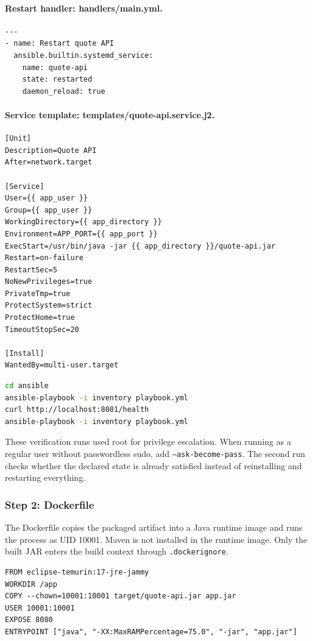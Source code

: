 \documentclass[12pt,a4paper]{article}
\begin{document}
\paragraph{Restart handler: handlers/main.yml.}

\begin{lstlisting}[language={}]
---
- name: Restart quote API
  ansible.builtin.systemd_service:
    name: quote-api
    state: restarted
    daemon_reload: true
\end{lstlisting}

\paragraph{Service template: templates/quote-api.service.j2.}

\begin{lstlisting}[language={}]
[Unit]
Description=Quote API
After=network.target

[Service]
User={{ app_user }}
Group={{ app_user }}
WorkingDirectory={{ app_directory }}
Environment=APP_PORT={{ app_port }}
ExecStart=/usr/bin/java -jar {{ app_directory }}/quote-api.jar
Restart=on-failure
RestartSec=5
NoNewPrivileges=true
PrivateTmp=true
ProtectSystem=strict
ProtectHome=true
TimeoutStopSec=20

[Install]
WantedBy=multi-user.target
\end{lstlisting}

\begin{lstlisting}[language={bash}]
cd ansible
ansible-playbook -i inventory playbook.yml
curl http://localhost:8081/health
ansible-playbook -i inventory playbook.yml
\end{lstlisting}


These verification runs used root for privilege escalation. When running as a regular user without passwordless sudo, add \texttt{--ask-become-pass}. The second run checks whether the declared state is already satisfied instead of reinstalling and restarting everything.

\subsubsection*{Step 2: Dockerfile}
The Dockerfile copies the packaged artifact into a Java runtime image and runs the process as UID 10001. Maven is not installed in the runtime image. Only the built JAR enters the build context through \texttt{.dockerignore}.

\begin{lstlisting}[language={}]
FROM eclipse-temurin:17-jre-jammy
WORKDIR /app
COPY --chown=10001:10001 target/quote-api.jar app.jar
USER 10001:10001
EXPOSE 8080
ENTRYPOINT ["java", "-XX:MaxRAMPercentage=75.0", "-jar", "app.jar"]
\end{lstlisting}
\end{document}
